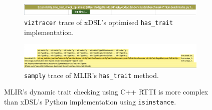 \begin{figure}[H]
    \centering
    \begin{subfigure}[b]{\textwidth}
        \includegraphics[width=\textwidth]{images/17_impact_dynamism/hastrait_xdsl_viztracer_optimised.png}
        \caption{\texttt{viztracer} trace of xDSL's optimised \texttt{has_trait} implementation.}
        \label{fig:ubenchmark-hastrait-xdsl-viztracer-optimised}
    \end{subfigure}
    \begin{subfigure}[b]{\textwidth}
        \includegraphics[width=\textwidth]{images/17_impact_dynamism/hastrait_mlir_samply.png}
        \caption{\texttt{samply} trace of MLIR's \texttt{has_trait} method.}
        \label{fig:ubenchmark-hastrait-mlir-samply}
    \end{subfigure}
    \caption{MLIR's dynamic trait checking using C++ RTTI is more complex than xDSL's Python implementation using \texttt{isinstance}.}
    \label{fig:ubenchmark-hastrait-dynamism}
\end{figure}
